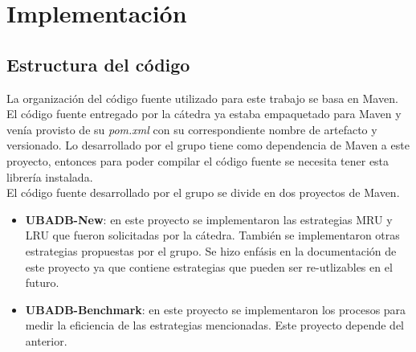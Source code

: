 \section{Implementaci\'on}

\subsection{Estructura del c\'odigo}
La organizaci\'on del c\'odigo fuente utilizado para este trabajo se basa en Maven. El
c\'odigo fuente entregado por la c\'atedra ya estaba empaquetado para Maven y ven\'ia
provisto de su \textit{pom.xml} con su correspondiente nombre de artefacto y versionado.
Lo desarrollado por el grupo tiene como dependencia de Maven a este proyecto, entonces 
para poder compilar el c\'odigo fuente se necesita tener esta librer\'ia instalada.\\

El c\'odigo fuente desarrollado por el grupo se divide en dos proyectos de Maven.
\begin{itemize}
\item \textbf{UBADB-New}: en este proyecto se implementaron las estrategias MRU y LRU 
que fueron solicitadas por la c\'atedra. Tambi\'en se implementaron otras estrategias 
propuestas por el grupo. Se hizo enf\'asis en la documentaci\'on de este proyecto ya
que contiene estrategias que pueden ser re-utlizables en el futuro.
\item \textbf{UBADB-Benchmark}: en este proyecto se implementaron los procesos para
medir la eficiencia de las estrategias mencionadas. Este proyecto depende del anterior.
\end{itemize}
  
   
